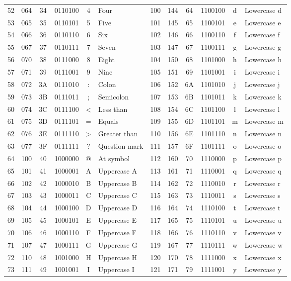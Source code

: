 \documentclass[a4paper, 12pt]{report}
\theoremstyle{remark}
\theoremstyle{definition}
\begin{document}
{\begin{tabular}{ |c|c|c|c|c|l|c|c|c|c|c|l| }
52 & 064 & 34& 0110100 & 4 & Four & 100 & 144 & 64& 1100100 &d&Lowercase d\\
53 & 065 & 35& 0110101 & 5 & Five & 101 & 145 & 65& 1100101 &e&Lowercase e\\
54 & 066 & 36& 0110110 & 6 & Six & 102 & 146 & 66& 1100110 &f&Lowercase f\\
55 & 067 & 37& 0110111 & 7 & Seven & 103 & 147 & 67 &1100111 &g&Lowercase g\\
56 & 070 & 38& 0111000 & 8 & Eight & 104 & 150 & 68& 1101000 &h&Lowercase h\\
57 & 071 & 39& 0111001 & 9 & Nine & 105 & 151 & 69& 1101001 &i&Lowercase i\\
58 & 072 & 3A& 0111010 & : & Colon & 106 & 152 & 6A& 1101010 &j&Lowercase j\\
59 & 073 & 3B& 0111011 & ; & Semicolon & 107 & 153 & 6B& 1101011 &k&Lowercase k\\
60 & 074 & 3C& 0111100 & < & Less than & 108 & 154 & 6C& 1101100 &l&Lowercase l\\
61 & 075 & 3D& 0111101 & = & Equals & 109 & 155 & 6D& 1101101 &m&Lowercase m\\
62 & 076 & 3E& 0111110 & > & Greater than & 110 & 156 & 6E& 1101110 &n&Lowercase n\\
63 & 077 & 3F& 0111111 & ? & Question mark & 111 & 157 & 6F& 1101111 &o&Lowercase o\\
64 & 100 & 40& 1000000 & @ & At symbol & 112 & 160 & 70& 1110000 &p&Lowercase p\\
65 & 101 & 41& 1000001 & A & Uppercase A & 113 & 161 & 71& 1110001 &q&Lowercase q\\
66 & 102 & 42& 1000010 & B& Uppercase B & 114 & 162 & 72& 1110010 &r&Lowercase r\\
67 & 103 & 43& 1000011 &C&Uppercase C & 115 & 163 & 73& 1110011 &s&Lowercase s\\
68 & 104 & 44& 1000100 &D&Uppercase D & 116 & 164 & 74& 1110100 &t&Lowercase t\\
69 & 105 & 45& 1000101 &E&Uppercase E & 117 & 165 & 75& 1110101 &u&Lowercase u\\
70 & 106 & 46& 1000110 &F&Uppercase F & 118 & 166 & 76& 1110110 &v&Lowercase v\\
71 & 107 & 47& 1000111 &G&Uppercase G & 119 & 167 & 77& 1110111 &w&Lowercase w\\
72 & 110 & 48& 1001000 &H&Uppercase H & 120 & 170 & 78& 1111000 &x&Lowercase x\\
73 & 111 & 49& 1001001 &I&Uppercase I & 121 & 171 & 79& 1111001 &y&Lowercase y\\

\end{tabular}}
\end{document}
